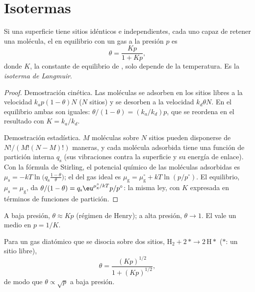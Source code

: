 \section{Isotermas}

\begin{theorem}\label{thm:b3:surfaces-catalysis:langmuir}
Si una superficie tiene sitios idénticos e independientes, cada uno capaz de retener una molécula, el
 en equilibrio con un gas a la presión $p$ es
\[
  \theta = \frac{Kp}{1 + Kp},
\]
donde $K$, la constante de equilibrio de , solo depende de la
temperatura. Es la \emph{isoterma de Langmuir}.
\end{theorem}

\begin{proof}
Demostración cinética. Las moléculas se adsorben en los sitios libres a la velocidad $k_ap(1 - \theta)N$ ($N$
sitios) y se desorben a la velocidad $k_d\theta N$. En el equilibrio ambas son iguales: $\theta/(1 - \theta)
= (k_a/k_d)p$, que se reordena en el resultado con $K = k_a/k_d$.

Demostración estadística. $M$ moléculas sobre $N$ sitios pueden disponerse de $N!/(M!(N - M)!)$ maneras,
y cada molécula adsorbida tiene una función de partición interna $q_{\mathrm s}$ (sus
vibraciones contra la superficie y su energía de enlace). Con la fórmula de Stirling,
el potencial químico de las moléculas adsorbidas es $\mu_{\mathrm s} = -kT\ln\bigl(q_{\mathrm s}\frac{1 - \theta}{\theta}\bigr)$;
el del gas ideal es $\mu_{\mathrm g} = \mu_{\mathrm g}^\circ + kT\ln(p/p^\circ)$. El equilibrio, $\mu_{\mathrm s} = \mu_{\mathrm g}$, da
$\theta/(1 - \theta) = q_{\mathrm s}\eu^{\mu_{\mathrm g}^\circ/kT}p/p^\circ$: la misma ley, con $K$ expresada en términos de
funciones de partición.
\end{proof}

A baja presión, $\theta \approx Kp$ (régimen de Henry); a alta presión, $\theta \to 1$. El
 vale un medio en $p = 1/K$.

\begin{proposition}\label{prop:b3:surfaces-catalysis:dissociative}
Para un gas diatómico que se disocia sobre dos sitios, $\mathrm{H_2} + 2\,{*} \to 2\,\mathrm{H}{*}$ (${*}$: un sitio libre),
\[
  \theta = \frac{(Kp)^{1/2}}{1 + (Kp)^{1/2}},
\]
de modo que $\theta \propto \sqrt p$ a baja presión.
\end{proposition}


